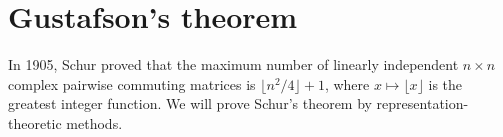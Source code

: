 
    



\section{Gustafson's theorem}

In 1905, Schur proved that the maximum number of linearly independent 
$n\times n$ complex pairwise commuting matrices is $\lfloor n^2/4\rfloor+1$, where $x\mapsto \lfloor x\rfloor$ is the 
greatest integer function. We will prove Schur's theorem by representation-theoretic methods.

